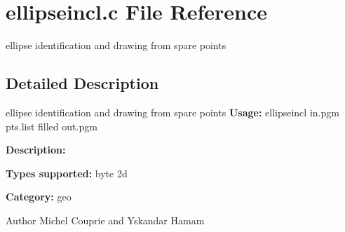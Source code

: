 \section{ellipseincl.c File Reference}
\label{ellipseincl_8c}


ellipse identification and drawing from spare points  




\subsection{Detailed Description}
ellipse identification and drawing from spare points {\bfseries Usage:} ellipseincl in.pgm pts.list filled out.pgm

{\bfseries Description:}

{\bfseries Types supported:} byte 2d

{\bfseries Category:} geo

\begin{DoxyAuthor}{Author}
Michel Couprie and Yskandar Hamam 
\end{DoxyAuthor}
